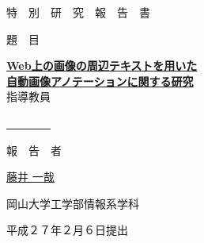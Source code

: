 \begin{center}
\vspace{80pt}

\large{特　別　研　究　報　告　書}

\vspace{60pt}
\large{題　目}
\vspace{60pt}

\underline{\bf \LARGE\hspace{5pt} Web上の画像の周辺テキストを用いた \hspace{5pt}} \\
\underline{\bf \LARGE\hspace{5pt} 自動画像アノテーションに関する研究 \hspace{5pt}} \\

\vspace{7pt}
\vspace{100pt}
\large{指導教員}
\vspace{15pt}

\underline{\LARGE\hspace{5pt} 　　\hspace{10pt}　　 \hspace{5pt}}

\vspace{50pt}
\large{報　告　者}
\vspace{10pt}

\underline{\LARGE \hspace{5pt} 藤井 \hspace{10pt} 一哉 \hspace{5pt}}

\vspace{110pt}
岡山大学工学部情報系学科

\vspace{20pt}
平成２７年２月６日提出
\end{center}